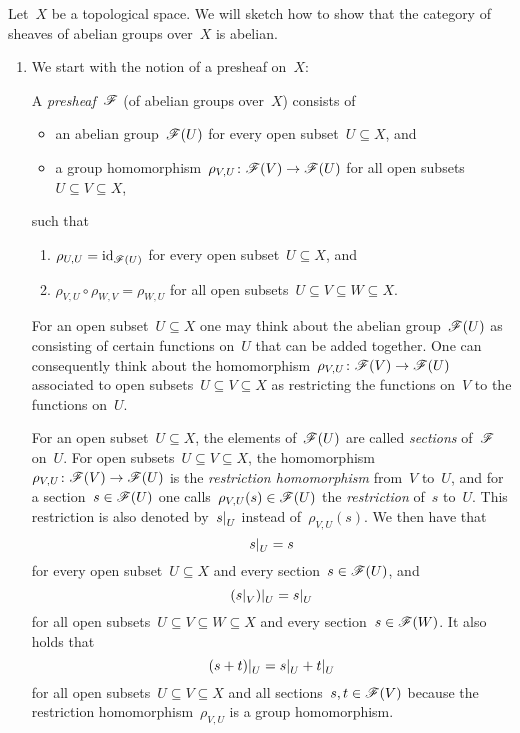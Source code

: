 


\begin{example}
  Let~$X$ be a topological space.
  We will sketch how to show that the category of sheaves of abelian groups over~$X$ is abelian.
  \begin{enumerate}
    \item
      We start with the notion of a presheaf on~$X$:
      
      \begin{definitionnonum}
        A \emph{presheaf}~$\mathscr{F}$ (of abelian groups over~$X$) consists of
        \begin{itemize}
          \item
            an abelian group~$\mathscr{F}(U)$ for every open subset~$U \subseteq X$, and
          \item
            a group homomorphism~$\rho_{V,U} \colon \mathscr{F}(V) \to \mathscr{F}(U)$ for all open subsets~$U \subseteq V \subseteq X$,
        \end{itemize}
        such that
        \begin{enumerate}[label=(P\arabic*)]
          \item
            $\rho_{U,U} = \operatorname{id}_{\mathscr{F}(U)}$ for every open subset~$U \subseteq X$, and
          \item
            $\rho_{V,U} \circ \rho_{W,V} = \rho_{W,U}$ for all open subsets~$U \subseteq V \subseteq W \subseteq X$.
        \end{enumerate}
      \end{definitionnonum}
      
      For an open subset~$U \subseteq X$ one may think about the abelian group~$\mathscr{F}(U)$ as consisting of certain functions on~$U$ that can be added together.
      One can consequently think about the homomorphism~$\rho_{V,U} \colon \mathscr{F}(V) \to \mathscr{F}(U)$ associated to open subsets~$U \subseteq V \subseteq X$ as restricting the functions on~$V$ to the functions on~$U$.
      
      For an open subset~$U \subseteq X$, the elements of~$\mathscr{F}(U)$ are called \emph{sections} of~$\mathscr{F}$ on~$U$.
      For open subsets~$U \subseteq V \subseteq X$, the homomorphism~$\rho_{V,U} \colon \mathscr{F}(V) \to \mathscr{F}(U)$ is the \emph{restriction homomorphism} from~$V$ to~$U$, and for a section~$s \in \mathscr{F}(U)$ one calls~$\rho_{V,U}(s) \in \mathscr{F}(U)$ the \emph{restriction} of~$s$ to~$U$.
      This restriction is also denoted by~$\restrict{s}{U}$ instead of~$\rho_{V,U}(s)$.
      We then have that
      \[
        \restrict{s}{U} = s
      \]
      for every open subset~$U \subseteq X$ and every section~$s \in \mathscr{F}(U)$, and
      \[
        \restrict{ (\restrict{s}{V}) }{U} = \restrict{s}{U}
      \]
      for all open subsets~$U \subseteq V \subseteq W \subseteq X$ and every section~$s \in \mathscr{F}(W)$.
      It also holds that
      \[
          \restrict{(s+t)}{U}
        = \restrict{s}{U} + \restrict{t}{U}
      \]
      for all open subsets~$U \subseteq V \subseteq X$ and all sections~$s, t \in \mathscr{F}(V)$  because the restriction homomorphism~$\rho_{V,U}$ is a group homomorphism.
      

\end{enumerate}
\end{example}
